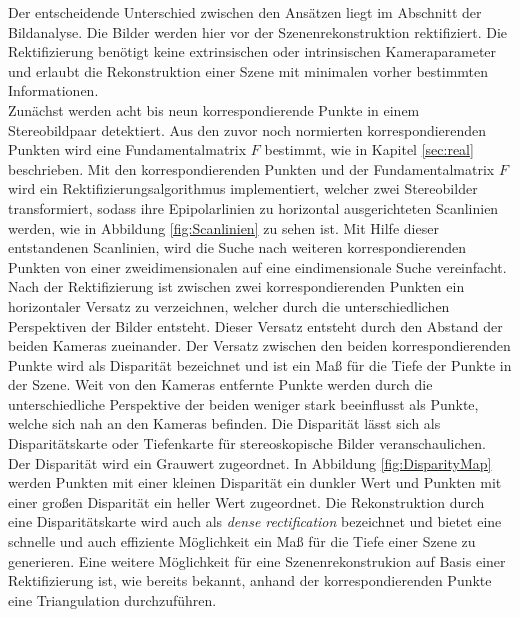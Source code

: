 Der entscheidende Unterschied zwischen den Ansätzen liegt im Abschnitt der Bildanalyse. Die Bilder werden hier vor der Szenenrekonstruktion rektifiziert. Die Rektifizierung benötigt keine extrinsischen oder intrinsischen Kameraparameter und erlaubt die Rekonstruktion einer Szene mit minimalen vorher bestimmten Informationen\cite{ZZ,Javier,Fusiello,phdextrinsicPara}.\\

%

Zunächst werden acht bis neun korrespondierende Punkte in einem Stereobildpaar detektiert. Aus den zuvor noch normierten korrespondierenden Punkten wird eine Fundamentalmatrix $F$ bestimmt, wie in Kapitel \ref{sec:real} beschrieben. Mit den korrespondierenden Punkten und der Fundamentalmatrix $F$ wird ein Rektifizierungsalgorithmus implementiert, welcher zwei Stereobilder transformiert, sodass ihre Epipolarlinien zu horizontal ausgerichteten Scanlinien werden, wie in Abbildung \ref{fig:Scanlinien} zu sehen ist. Mit Hilfe dieser entstandenen Scanlinien, wird die Suche nach weiteren korrespondierenden Punkten von einer zweidimensionalen auf eine eindimensionale Suche vereinfacht\cite{ZZ,Fusiello,Javier}.\\

Nach der Rektifizierung ist zwischen zwei korrespondierenden Punkten ein horizontaler Versatz zu verzeichnen, welcher durch die unterschiedlichen Perspektiven der Bilder entsteht. Dieser Versatz entsteht durch den Abstand der beiden Kameras zueinander. Der Versatz zwischen den beiden korrespondierenden Punkte wird als Disparität bezeichnet und ist ein Maß für die Tiefe der Punkte in der Szene\cite{Javier,Fusiello}. Weit von den Kameras entfernte Punkte werden durch die unterschiedliche Perspektive der beiden weniger stark beeinflusst als Punkte, welche sich nah an den Kameras befinden. Die Disparität lässt sich als Disparitätskarte oder Tiefenkarte für stereoskopische Bilder veranschaulichen\cite{Javier}. Der Disparität wird ein Grauwert zugeordnet. In Abbildung \ref{fig:DisparityMap} werden Punkten mit einer kleinen Disparität ein dunkler Wert und Punkten mit einer großen Disparität ein heller Wert zugeordnet. Die Rekonstruktion durch eine Disparitätskarte wird auch als \textit{dense rectification} bezeichnet und bietet eine schnelle und auch effiziente Möglichkeit ein Maß für die Tiefe einer Szene zu generieren\cite{Javier,Fusiello,ZZ}. Eine weitere Möglichkeit für eine Szenenrekonstrukion auf Basis einer Rektifizierung ist, wie bereits bekannt, anhand der korrespondierenden Punkte eine Triangulation durchzuführen\cite{Javier}.\\

